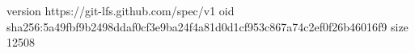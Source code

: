version https://git-lfs.github.com/spec/v1
oid sha256:5a49fbf9b2498ddaf0cf3e9ba24f4a81d0d1cf953c867a74c2ef0f26b46016f9
size 12508
